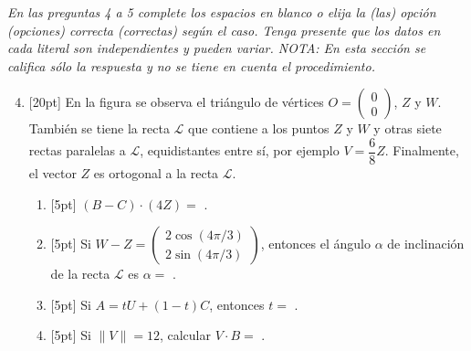 \documentclass[11pt]{article}
\newcommand{\vect}[2]{\begin{pmatrix}#1\\#2\end{pmatrix}}
\newcommand{\nota}[1]{{\small\itshape\color{unalblue!70!black} #1}}
\begin{document}
\vspace{6pt}
\nota{En las preguntas 4 a 5 complete los espacios en blanco o elija la (las) opción (opciones) correcta (correctas) según el caso. Tenga presente que los datos en cada literal son independientes y pueden variar. NOTA: En esta sección se califica sólo la respuesta y no se tiene en cuenta el procedimiento.}

\begin{enumerate}
\setcounter{enumi}{3}
\item{}[20pt] En la figura se observa el triángulo de vértices $O=\vect{0}{0}$, $Z$ y $W$. También se tiene la recta $\mathcal{L}$ que contiene a los puntos $Z$ y $W$ y otras siete rectas paralelas a $\mathcal{L}$, equidistantes entre sí, por ejemplo $V=\dfrac{6}{8}Z$. Finalmente, el vector $Z$ es ortogonal a la recta $\mathcal{L}$.

\begin{center}
\end{center}

\begin{enumerate}[label=(\alph*)]
\item{}[5pt] $(B-C)\cdot(4Z)=$ \underline{\hspace{4cm}}.
\item{}[5pt] Si $W-Z=\vect{2\cos(4\pi/3)}{2\sin(4\pi/3)}$, entonces el ángulo $\alpha$ de inclinación de la recta $\mathcal{L}$ es $\alpha=$ \underline{\hspace{4cm}}.
\item{}[5pt] Si $A=tU+(1-t)C$, entonces $t=$ \underline{\hspace{4cm}}.
\item{}[5pt] Si $\|V\|=12$, calcular $V\cdot B=$ \underline{\hspace{4cm}}.
\end{enumerate}


\end{enumerate}
\end{document}
